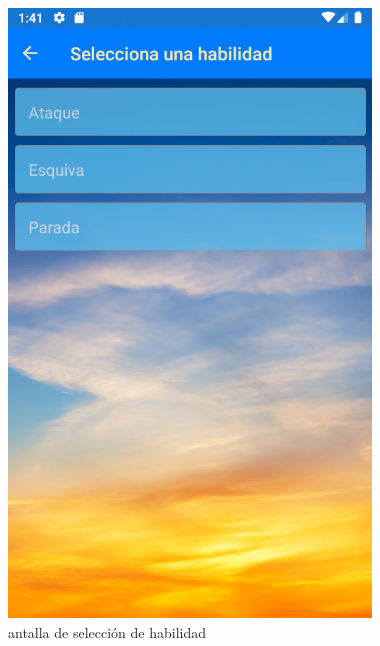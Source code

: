 \begin{figure}[H]
    \centering
    \includegraphics[scale=0.3]{Figures/Capturas/SeleccionarHabilidad.png}
    \caption{antalla de selección de habilidad}
    \label{SeleccionHabilidad}    
\end{figure}

